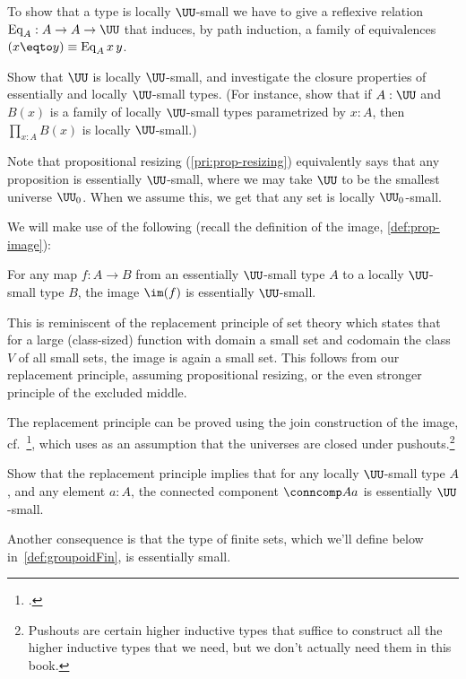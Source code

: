 To show that a type is locally $\UU$-small
we have to give a reflexive relation
$\mathrm{Eq}_A : A \to A \to \UU$
that induces, by path induction, a family of equivalences
$(x \eqto y) \equiv \mathrm{Eq}_A\,x\,y$.

\begin{xca}
  Show that $\UU$ is locally $\UU$-small, and investigate
  the closure properties of essentially and locally $\UU$-small types.
  (For instance, show that if $A:\UU$ and $B(x)$ is a family of locally $\UU$-small
  types parametrized by $x:A$, then $\prod_{x:A}B(x)$ is locally $\UU$-small.)
\end{xca}

\begin{remark}
  Note that propositional resizing (\cref{pri:prop-resizing})
  equivalently says that any proposition is essentially $\UU$-small,
  where we may take $\UU$ to be the smallest universe $\UU_0$.
  When we assume this, we get that any set is locally $\UU_0$-small.
\end{remark}

We will make use of the following (recall the definition of the image, \cref{def:prop-image}):
\begin{principle}[Replacement]
  \label{pri:replacement}
  For any map $f : A \to B$
  from an essentially $\UU$-small type $A$
  to a locally $\UU$-small type $B$,
  the image $\im(f)$ is essentially $\UU$-small.
\end{principle}
This is reminiscent of the replacement principle of set theory which states
that for a large (class-sized) function with domain a small set
and codomain the class $V$ of all small sets,
the image is again a small set.
This follows from our replacement principle,
assuming propositional resizing, or the even stronger principle of the excluded middle.

The replacement principle can be proved using the join construction of the image, cf.~\citeauthor{Rijke-Join}\footcite{Rijke-Join},
which uses as an assumption that the universes
are closed under pushouts.\footnote{%
  Pushouts are certain higher inductive types that suffice
  to construct all the higher inductive types that we need,
  but we don't actually need them in this book.}
\begin{xca}\label{xca:comp-loc-small-ess-small}
  Show that the replacement principle implies that for any locally $\UU$-small type $A$,
  and any element $a:A$,
  the connected component $\conncomp A a$ is essentially $\UU$-small.
\end{xca}
Another consequence is that the type of finite sets, which we'll define below
in~\cref{def:groupoidFin}, is essentially small.


